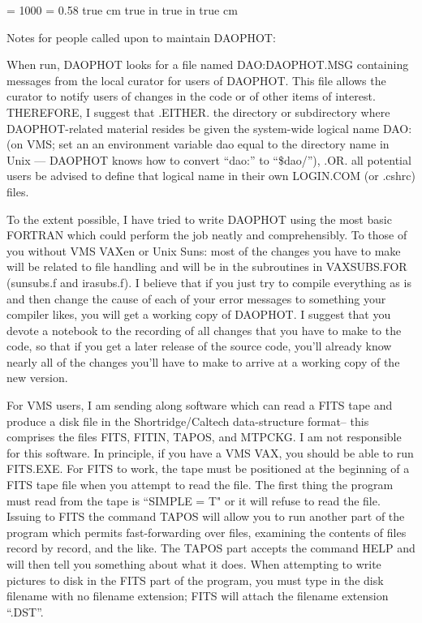 \def\hi{\noindent \hangindent=20 pt}
\def\etal{{\it et~al.}}
\def\ie{{\it i.e.} }
\def\eg{{\it e.g.}}
\def\cf{{\it cf.}}
\def\ni{\noindent}
\def\Item{\item {$\bullet$}}
\def\kms{~km\thinspace s$^{-1}$}
\def\cl{\centerline}
\def\Mag{${}^{\rm m}$\llap{.}}
\def\Deg{${}^\circ$\llap{.}}
\def\Arcsec{${}^{\prime\prime}$\llap{.}}
\def\today{\number\year\space \ifcase\month\or
  January\or February\or March\or April\or May\or June\or
  July\or August\or September\or October\or November\or December\fi
  \space\number\day}
\magnification = 1000
\baselineskip = 0.58 true cm
 true in
 true in
 true cm
\tenrm
\centerline{Notes for people called upon to maintain DAOPHOT:}
\bigskip
     When run, DAOPHOT looks for a file named DAO:DAOPHOT.MSG containing
messages from the local curator for users of DAOPHOT.  This file allows
the curator to notify users of changes in the code or of other items of 
interest.  THEREFORE, I suggest that .EITHER. the directory or 
subdirectory where DAOPHOT-related material resides be given the 
system-wide logical name DAO: (on VMS; set an an environment variable 
dao equal to the directory name in Unix --- DAOPHOT knows how to 
convert ``dao:'' to ``\$dao/''), .OR. all potential users be advised to 
define that logical name in their own LOGIN.COM (or .cshrc) files.

     To the extent possible, I have tried to write DAOPHOT using the
most basic FORTRAN which could perform the job neatly and
comprehensibly.  To those of you without VMS VAXen or Unix Suns:  most
of the changes you have to make will be related to file handling and
will be in the subroutines in VAXSUBS.FOR (sunsubs.f and irasubs.f). I
believe that if you just try to compile everything as is and then
change the cause of each of your error messages to something your
compiler likes, you will get a working copy of DAOPHOT.  I suggest that
you devote a notebook to the recording of all changes that you have to
make to the code, so that if you get a later release of the source
code, you'll already know nearly all of the changes you'll have to make
to arrive at a working copy of the new version.

     For VMS users, I am sending along software which can read a FITS
tape and produce a disk file in the Shortridge/Caltech data-structure
format--  this comprises the files FITS, FITIN, TAPOS, and MTPCKG.  I
am not responsible for this software.  In principle, if you have a VMS
VAX, you should be able to run FITS.EXE.  For FITS to work, the tape
must be positioned at the beginning of a FITS tape file when you
attempt to read the file.  The first thing the program must read from
the tape is ``SIMPLE = T" or it will refuse to read the file.  Issuing
to FITS the command TAPOS will allow you to run another part of the
program which permits fast-forwarding over files, examining the
contents of files record by record, and the like.  The TAPOS part
accepts the command HELP and will then tell you something about what it
does.  When attempting to write pictures to disk in the FITS part of
the program, you must type in the disk filename with no filename
extension; FITS will attach the filename extension ``.DST''.

